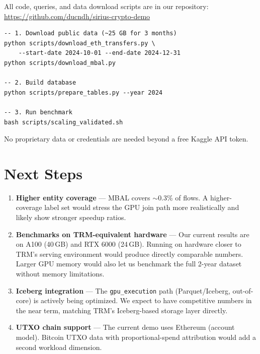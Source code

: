 \documentclass[11pt,a4paper]{article}
\begin{document}
All code, queries, and data download scripts are in our repository:
\url{https://github.com/ducndh/sirius-crypto-demo}

\begin{lstlisting}
-- 1. Download public data (~25 GB for 3 months)
python scripts/download_eth_transfers.py \
    --start-date 2024-10-01 --end-date 2024-12-31
python scripts/download_mbal.py

-- 2. Build database
python scripts/prepare_tables.py --year 2024

-- 3. Run benchmark
bash scripts/scaling_validated.sh
\end{lstlisting}

No proprietary data or credentials are needed beyond a free Kaggle API token.

\section{Next Steps}

\begin{enumerate}[nosep]
    \item \textbf{Higher entity coverage} --- MBAL covers $\sim$0.3\% of flows.
    A higher-coverage label set would stress the GPU join path more
    realistically and likely show stronger speedup ratios.

    \item \textbf{Benchmarks on TRM-equivalent hardware} --- Our current results
    are on A100 (40\,GB) and RTX 6000 (24\,GB). Running on hardware closer to
    TRM's serving environment would produce directly comparable numbers. Larger
    GPU memory would also let us benchmark the full 2-year dataset without
    memory limitations.

    \item \textbf{Iceberg integration} --- The \texttt{gpu\_execution} path
    (Parquet/Iceberg, out-of-core) is actively being optimized. We expect to
    have competitive numbers in the near term, matching TRM's Iceberg-based
    storage layer directly.

    \item \textbf{UTXO chain support} --- The current demo uses Ethereum
    (account model). Bitcoin UTXO data with proportional-spend attribution
    would add a second workload dimension.
\end{enumerate}
\end{document}
